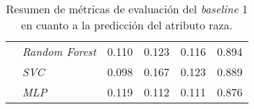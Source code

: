 \begin{table}[htpb]
{\begin{tabular}{llcccc}
                                            & \emph{Random Forest}        & 0.110 & 0.123 & 0.116 & 0.894\\
        \cmidrule{2-6}
                                            & \emph{SVC}                  & 0.098 & 0.167 & 0.123 & 0.889\\
        \cmidrule{2-6}
                                            & \emph{MLP}                  & 0.119 & 0.112 & 0.111 & 0.876\\
        \bottomrule
        \end{tabular}}
    \caption{Resumen de m\'etricas de evaluaci\'on del \emph{baseline} 1 en cuanto a la predicci\'on del atributo raza.}
    \label{table:eval_baseline1_race}
\end{table}

\begin{table}[htpb]
    \centering
    \caption{Resumen de m\'etricas de evaluaci\'on del \emph{baseline} 2 en cuanto a la predicci\'on del atributo g\'enero.}
    \label{table:eval_baseline2_gender}
\end{table}

\begin{table}[htpb]
    \centering
    \caption{Resumen de m\'etricas de evaluaci\'on del \emph{baseline} 2 en cuanto a la predicci\'on del atributo g\'enero.}
    \label{table:eval_baseline2_race}
\end{table}



